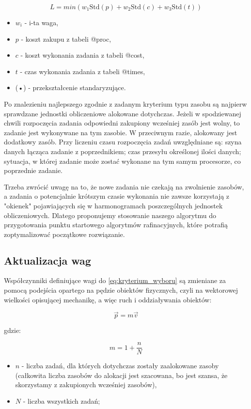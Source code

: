 \documentclass[a4paper,11pt]{article}
\begin{document}
\begin{equation}
    L = min({w_1}\text{Std}(p) + {w_2}\text{Std}(c) + {w_3}\text{Std}(t))
    \label{eq:kryterium_wyboru}
\end{equation}
\begin{itemize}
\item \(w_i\) - i-ta waga,
\item \(p\) - koszt zakupu z tabeli @proc,
\item \(c\) - koszt wykonania zadania z tabeli @cost,
\item \(t\) - czas wykonania zadania z tabeli @times,
\item {}(•) - przekształcenie standaryzujące.
\end{itemize}

Po znalezieniu najlepszego zgodnie z zadanym kryterium typu zasobu są najpierw
sprawdzane jednostki obliczeniowe alokowane dotychczas. Jeżeli w spodziewanej
chwili rozpoczęcia zadania odpowiedni zakupiony wcześniej zasób jest wolny, to
zadanie jest wykonywane na tym zasobie. W przeciwnym razie, alokowany jest
dodatkowy zasób. Przy liczeniu czasu rozpoczęcia zadań uwzględniane są:
szyna danych łącząca zadanie z poprzednikiem; czas przesyłu określonej ilości
danych; sytuacja, w której zadanie może zostać wykonane na tym samym procesorze,
co poprzednie zadanie.

Trzeba zwrócić uwagę na to, że nowe zadania nie czekają na zwolnienie zasobów, a
zadania o potencjalnie krótszym czasie wykonania nie zawsze korzystają z
"okienek" pojawiających się w harmonogramach poszczególnych jednostek 
obliczeniowych. Dlatego proponujemy stosowanie naszego algorytmu do przygotowania 
punktu startowego algorytmów rafinacyjnych, które potrafią zoptymalizować 
początkowe rozwiązanie.


\subsection{Aktualizacja wag}
Współczynniki definiujące wagi do \ref{eq:kryterium_wyboru} są zmieniane
za pomocą podejścia opartego na pędzie obiektów fizycznych, czyli na wektorowej
wielkości opisującej mechanikę, a więc ruch i oddziaływania obiektów:

\begin{equation}
    \vec{p} = m \vec{v}
    \label{eq:pęd}
\end{equation}

gdzie:

\begin{equation*}
    m = 1 + \frac{n}{N}
\end{equation*}
\begin{itemize}
    \item \(n\) - liczba zadań, dla których dotychczas zostały zaalokowane
    zasoby (całkowita liczba zasobów do alokacji jest szacowana, bo jest szansa,
    że skorzystamy z zakupionych wcześniej zasobów),
    \item \(N\) - liczba wszystkich zadań;
\end{itemize}
\end{document}
